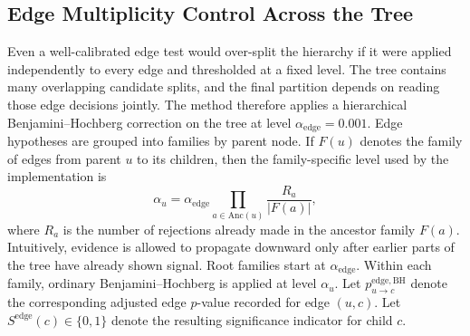 
\subsection{Edge Multiplicity Control Across the Tree}

Even a well-calibrated edge test would over-split the hierarchy if it were
applied independently to every edge and thresholded at a fixed level. The tree
contains many overlapping candidate splits, and the final partition depends on
reading those edge decisions jointly. The method therefore applies a
hierarchical Benjamini--Hochberg correction on the tree
\citep{bogomolov2021hypotheses} at level
$\alpha_{\mathrm{edge}} = 0.001$. Edge hypotheses are grouped into families by
parent node. If $F(u)$ denotes the family of edges from parent $u$ to its
children, then the family-specific level used by the implementation is
\begin{equation}
\alpha_u
=
\alpha_{\mathrm{edge}}
\prod_{a \in \mathrm{Anc}(u)}
\frac{R_a}{|F(a)|},
\end{equation}
where $R_a$ is the number of rejections already made in the ancestor family
$F(a)$. Intuitively, evidence is allowed to propagate downward only after
earlier parts of the tree have already shown signal. Root families start at
$\alpha_{\mathrm{edge}}$. Within each family, ordinary Benjamini--Hochberg is
applied at level $\alpha_u$. Let
$p_{u \to c}^{\mathrm{edge,BH}}$ denote the corresponding adjusted edge
$p$-value recorded for edge $(u,c)$. Let
$S^{\mathrm{edge}}(c) \in \{0,1\}$ denote the resulting significance indicator
for child $c$.
